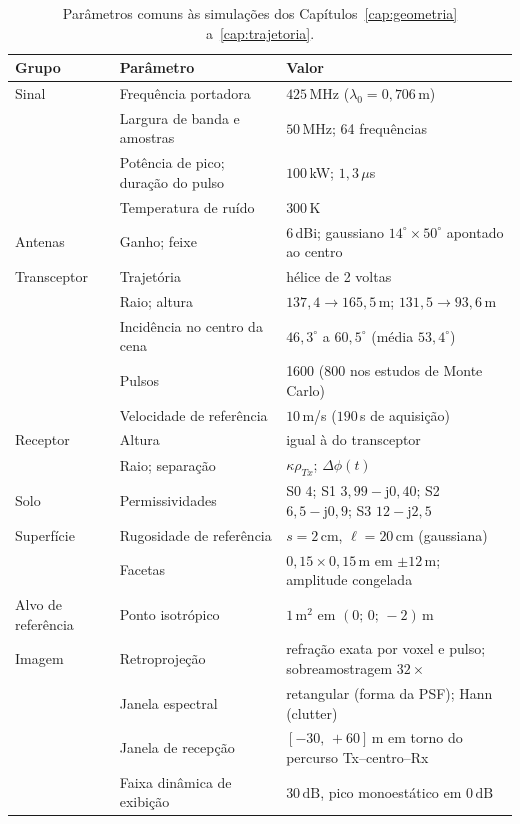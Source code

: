 \documentclass[12pt,a4paper,oneside]{book}
\theoremstyle{remark}
\newcommand{\jj}{\mathrm{j}}
\newcommand{\dB}{\,\mathrm{dB}}
\theoremstyle{plain}
\theoremstyle{definition}
\begin{document}
\begin{table}[H]
\centering\small
\caption{Parâmetros comuns às simulações dos Capítulos~\ref{cap:geometria}
a~\ref{cap:trajetoria}.}
\label{tab:app_parametros}
\begin{tabular}{@{}L{2.6cm}L{4.9cm}L{7.0cm}@{}}
\toprule
Grupo & Parâmetro & Valor \\
\midrule
Sinal & Frequência portadora & $425\,$MHz ($\lambda_0=0,706\,$m) \\
      & Largura de banda e amostras & $50\,$MHz; 64 frequências \\
      & Potência de pico; duração do pulso & $100\,$kW; $1,3\,\mu$s \\
      & Temperatura de ruído & $300\,$K \\
Antenas & Ganho; feixe & $6\,$dBi; gaussiano $14^\circ\times50^\circ$ apontado ao centro \\
Transceptor & Trajetória & hélice de 2 voltas \\
            & Raio; altura & $137,4\to165,5\,$m; $131,5\to93,6\,$m \\
            & Incidência no centro da cena & $46,3^\circ$ a $60,5^\circ$ (média $53,4^\circ$) \\
            & Pulsos & 1600 (800 nos estudos de Monte Carlo) \\
            & Velocidade de referência & $10\,$m/s ($190\,$s de aquisição) \\
Receptor & Altura & igual à do transceptor \\
         & Raio; separação & $\kappa\rho_{Tx}$; $\Delta\phi(t)$ \\
Solo & Permissividades & S0 $4$; S1 $3,99-\jj0,40$; S2 $6,5-\jj0,9$; S3 $12-\jj2,5$ \\
Superfície & Rugosidade de referência & $s=2\,$cm, $\ell=20\,$cm (gaussiana) \\
           & Facetas & $0,15\times0,15\,$m em $\pm12\,$m; amplitude congelada \\
Alvo de referência & Ponto isotrópico & $1\,$m$^2$ em $(0;\,0;\,-2)\,$m \\
Imagem & Retroprojeção & refração exata por voxel e pulso; sobreamostragem $32\times$ \\
       & Janela espectral & retangular (forma da PSF); Hann (clutter) \\
       & Janela de recepção & $[-30,\,+60]\,$m em torno do percurso Tx--centro--Rx \\
       & Faixa dinâmica de exibição & $30\dB$, pico monoestático em $0\dB$ \\
\bottomrule
\end{tabular}
\end{table}
\end{document}
